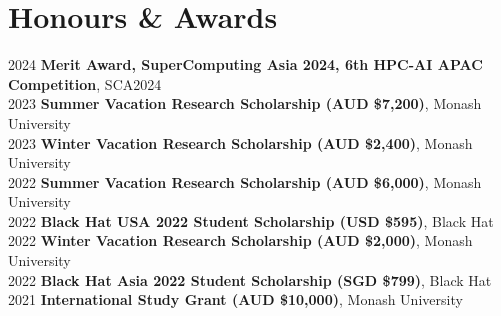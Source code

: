 \section{Honours \& Awards}
\begin{itemize}[leftmargin=0.15in, label={}]
    \small{\item{
        {2024}{ \textbf{Merit Award, SuperComputing Asia 2024, 6th HPC-AI APAC Competition}, SCA2024} \\
        {2023}{ \textbf{Summer Vacation Research Scholarship (AUD \$7,200)}, Monash University} \\
        {2023}{ \textbf{Winter Vacation Research Scholarship (AUD \$2,400)}, Monash University} \\
        {2022}{ \textbf{Summer Vacation Research Scholarship (AUD \$6,000)}, Monash University} \\
        {2022}{ \textbf{Black Hat USA 2022 Student Scholarship (USD \$595)}, Black Hat} \\
        {2022}{ \textbf{Winter Vacation Research Scholarship (AUD \$2,000)}, Monash University} \\
        {2022}{ \textbf{Black Hat Asia 2022 Student Scholarship (SGD \$799)}, Black Hat} \\
        {2021}{ \textbf{International Study Grant (AUD \$10,000)}, Monash University} \\
    }}
\end{itemize}
